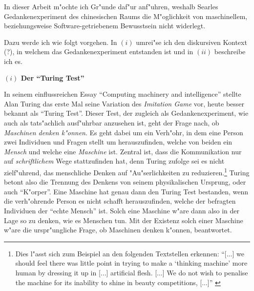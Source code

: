 \documentclass[a4paper, emulatestandardclasses, 12pt]{scrartcl}
\begin{document}
\begin{onehalfspace} 

%


\noindent In dieser Arbeit m"ochte ich Gr"unde daf"ur anf"uhren, weshalb Searles Gedankenexperiment des chinesischen Raums die M"oglichkeit von maschinellem, beziehungsweise Software-getriebenem Bewusstsein nicht widerlegt.

Dazu werde ich wie folgt vorgehen. In $(i)$ umrei"se ich den diskursiven Kontext (?), in welchem das Gedankenexperiment entstanden ist und in $(ii)$ beschreibe ich es. %
\vspace{5mm}


\noindent\textbf{$(i)$ Der "`Turing Test"'}

\noindent In seinem einflussreichen Essay "`Computing machinery and intelligence"' \citep{turing1950computing} stellte Alan Turing das erste Mal seine Variation des \emph{Imitation Game} vor, heute besser bekannt als "`Turing Test"'. Dieser Test, der zugleich als Gedankenexperiment, wie auch als tats"achlich ausf"uhrbar anzusehen ist, geht der Frage nach, ob \emph{Maschinen denken k"onnen}. Es geht dabei um ein Verh"ohr, in dem eine Person zwei Individuen und Fragen stellt um herauszufinden, welche von beiden ein \emph{Mensch} und welche eine \emph{Maschine} ist. Zentral ist, dass die Kommunikation nur auf \emph{schriftlichem} Wege stattzufinden hat, denn Turing zufolge sei es nicht zielf"uhrend, das menschliche Denken auf "Au"serlichkeiten zu reduzieren.\footnote{Dies l"asst sich zum Beispiel an den folgenden Textstellen erkennen: "`[...] we should feel there was little point in trying to make a `thinking machine' more human by dressing it up in [...] artificial flesh. [...] We do not wish to penalise the machine for its inability to shine in beauty competitions, [...]"' \citep[S. 434]{turing1950computing}} Turing betont also die Trennung des Denkens von seinem physikalischen Ursprung, oder auch "`K"orper"'. Eine Maschine hat genau dann den Turing Test bestanden, wenn die verh"ohrende Person es nicht schafft herauszufinden, welche der befragten Individuen der "`echte Mensch"' ist. Solch eine Maschine w"are dann also in der Lage so zu denken, wie es Menschen tun. Mit der Existenz solch einer Maschine w"are die urspr"ungliche Frage, ob Maschinen denken k"onnen, beantwortet.


\end{onehalfspace}
\end{document}
